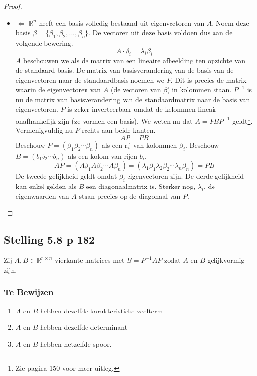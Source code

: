 \documentclass[lineaire_algebra_oplossingen.tex]{subfiles}
\begin{document}
\begin{proof}
\begin{itemize}
\item $\Leftarrow$
$\mathbb{R}^n$ heeft een basis volledig bestaand uit eigenvectoren van $A$. Noem deze basis $\beta = \{\beta_1,\beta_2,...,\beta_n\}$. De vectoren uit deze basis voldoen dus aan de volgende bewering.
\[
A\cdot \beta_i = \lambda_i\beta_i
\]
$A$ beschouwen we als de matrix van een lineaire afbeelding ten opzichte van de standaard basis.
De matrix van basisverandering van de basis van de eigenvectoren naar de standaardbasis noemen we $P$.
Dit is precies de matrix waarin de eigenvectoren van $A$ (de vectoren van $\beta$) in kolommen staan.
$P^{-1}$ is nu de matrix van basisverandering van de standaardmatrix naar de basis van eigenvectoren.
$P$ is zeker inverteerbaar omdat de kolommen lineair onafhankelijk zijn (ze vormen een basis).
We weten nu dat $A = PBP^{-1}$ geldt\footnote{Zie pagina 150 voor meer uitleg.}. Vermenigvuldig nu $P$ rechts aan beide kanten.
\[
AP = PB
\]
Beschouw $P = (\beta_1 \beta_2 \cdots \beta _n)$ als een rij van kolommen $\beta_i$. Beschouw $B = (b_1 b_2 \cdots b_n)$ als een kolom van rijen $b_i$.
\[
AP = (A\beta_1 A\beta_2 \cdots A\beta_n) = (\lambda_1\beta_1 \lambda_2\beta_2 \cdots \lambda_n\beta_n) = PB
\]
De tweede gelijkheid geldt omdat $\beta_i$ eigenvectoren zijn.
De derde gelijkheid kan enkel gelden als $B$ een diagonaalmatrix is. Sterker nog, $\lambda_i$, de eigenwaarden van $A$ staan precies op de diagonaal van $P$.
\end{itemize}
\end{proof}


\subsection{Stelling 5.8 p 182}
\label{5.8}
Zij $A,B \in \mathbb{R}^{n\times n}$ vierkante matrices met $B = P^{-1}AP$ zodat $A$ en $B$ gelijkvormig zijn.

\subsubsection*{Te Bewijzen}
\begin{enumerate}
\item $A$ en $B$ hebben dezelfde karakteristieke veelterm.
\item $A$ en $B$ hebben dezelfde determinant.
\item $A$ en $B$ hebben hetzelfde spoor.
\end{enumerate}
\end{document}
